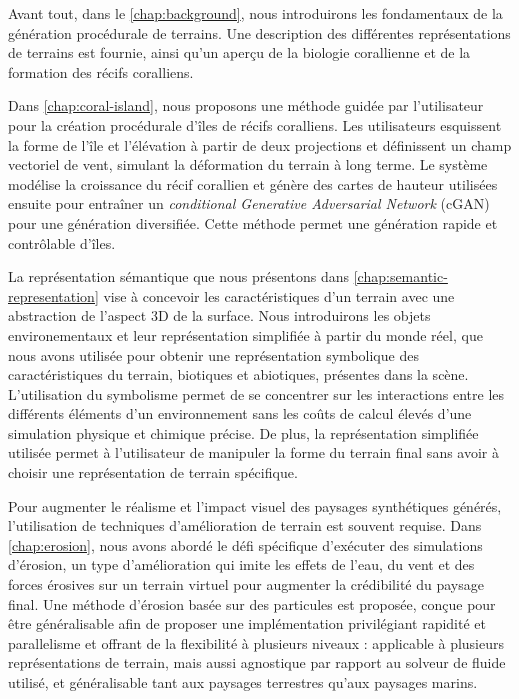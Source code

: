 Avant tout, dans le \cref{chap:background}, nous introduirons les fondamentaux de la génération procédurale de terrains. Une description des différentes représentations de terrains est fournie, ainsi qu'un aperçu de la biologie corallienne et de la formation des récifs coralliens.

Dans \cref{chap:coral-island}, nous proposons une méthode guidée par l'utilisateur pour la création procédurale d'îles de récifs coralliens. Les utilisateurs esquissent la forme de l'île et l'élévation à partir de deux projections et définissent un champ vectoriel de vent, simulant la déformation du terrain à long terme. Le système modélise la croissance du récif corallien et génère des cartes de hauteur utilisées ensuite pour entraîner un \textit{conditional Generative Adversarial Network} (cGAN) pour une génération diversifiée. Cette méthode permet une génération rapide et contrôlable d'îles.

La représentation sémantique que nous présentons dans \cref{chap:semantic-representation} vise à concevoir les caractéristiques d'un terrain avec une abstraction de l'aspect 3D de la surface. Nous introduirons les objets environementaux et leur représentation simplifiée à partir du monde réel, que nous avons utilisée pour obtenir une représentation symbolique des caractéristiques du terrain, biotiques et abiotiques, présentes dans la scène. L'utilisation du symbolisme permet de se concentrer sur les interactions entre les différents éléments d'un environnement sans les coûts de calcul élevés d'une simulation physique et chimique précise. De plus, la représentation simplifiée utilisée permet à l'utilisateur de manipuler la forme du terrain final sans avoir à choisir une représentation de terrain spécifique.

Pour augmenter le réalisme et l'impact visuel des paysages synthétiques générés, l'utilisation de techniques d'amélioration de terrain est souvent requise. Dans \cref{chap:erosion}, nous avons abordé le défi spécifique d'exécuter des simulations d'érosion, un type d'amélioration qui imite les effets de l'eau, du vent et des forces érosives sur un terrain virtuel pour augmenter la crédibilité du paysage final. Une méthode d'érosion basée sur des particules est proposée, conçue pour être généralisable afin de proposer une implémentation privilégiant rapidité et parallelisme et offrant de la flexibilité à plusieurs niveaux : applicable à plusieurs représentations de terrain, mais aussi agnostique par rapport au solveur de fluide utilisé, et  généralisable tant aux paysages terrestres qu'aux paysages marins.







